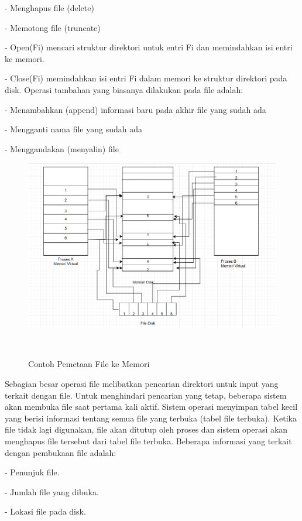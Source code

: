 \documentclass[12pt]{article}
\begin{document}
\begin{itemize}
     		- Menghapus file (delete) 
    
        	- Memotong file (truncate)  
    
        	- Open(Fi) mencari struktur direktori untuk entri Fi dan memindahkan isi entri ke memori. 
    
     		- Close(Fi) memindahkan isi entri Fi dalam memori ke struktur direktori pada disk. 
     		   Operasi tambahan yang biasanya dilakukan pada file 
                  adalah: 
    
     		- Menambahkan (append) informasi baru pada akhir file yang sudah ada 
    
     		- Mengganti nama file yang sudah ada 
    
     		- Menggandakan (menyalin) file
       
                \begin{figure}[h]
                            \centering
                            \includegraphics[width=0.5\linewidth]
                            {asset/gambarfilesystem.png}
                            \caption{Contoh Pemetaan File ke Memori}
                            \label{fig:deadlock-RAG}
                            \end{figure}
       
              Sebagian besar operasi file melibatkan pencarian direktori untuk input yang terkait dengan file. Untuk menghindari pencarian yang tetap, beberapa sistem akan membuka file saat pertama kali aktif. Sistem operasi menyimpan tabel kecil yang berisi informasi tentang semua file yang terbuka (tabel file terbuka). Ketika file tidak lagi digunakan, file akan ditutup oleh proses dan sistem operasi akan menghapus file tersebut dari tabel file terbuka. Beberapa informasi yang terkait dengan pembukaan file adalah: 
    
     		 - Penunjuk file. 
    
     		 - Jumlah file yang dibuka. 
    
     		 - Lokasi file pada disk. 
    

\end{itemize}
\end{document}
